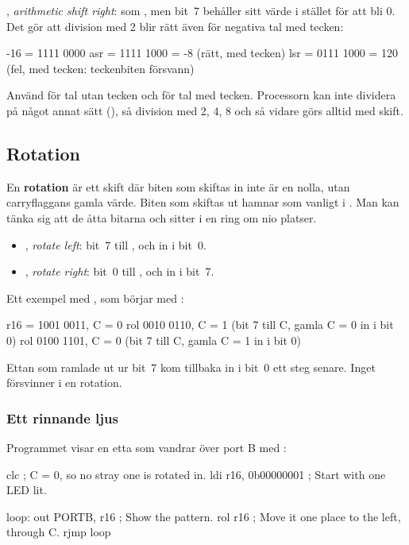 \textbf{}, \emph{arithmetic shift right}: som , men bit~7 behåller sitt värde i
stället för att bli 0. Det gör att division med 2 blir rätt även för negativa tal med tecken:

\begin{textdrawing}
   -16  =  1111 0000
   asr  =  1111 1000  =  -8     (rätt, med tecken)
   lsr  =  0111 1000  =  120    (fel, med tecken: teckenbiten försvann)
\end{textdrawing}

\noindent Använd  för tal utan tecken och  för tal med tecken. Processorn kan
inte dividera på något annat sätt (), så division med 2, 4, 8 och så vidare görs
alltid med skift.

\subsection{Rotation}
\label{c8:b4}
En \textbf{rotation} är ett skift där biten som skiftas in inte är en nolla, utan carryflaggans
gamla värde. Biten som skiftas ut hamnar som vanligt i . Man kan tänka sig att de åtta
bitarna och  sitter i en ring om nio platser.

\begin{itemize}
  \item \textbf{}, \emph{rotate left}: bit~7 till , och  in i bit~0.
  \item \textbf{}, \emph{rotate right}: bit~0 till , och  in i bit~7.
\end{itemize}

Ett exempel med , som börjar med :

\begin{textdrawing}
   r16 = 1001 0011, C = 0
   rol   0010 0110, C = 1     (bit 7 till C, gamla C = 0 in i bit 0)
   rol   0100 1101, C = 0     (bit 7 till C, gamla C = 1 in i bit 0)
\end{textdrawing}

\noindent Ettan som ramlade ut ur bit~7 kom tillbaka in i bit~0 ett steg senare. Inget försvinner i
en rotation.

\subsubsection{Ett rinnande ljus}
Programmet  visar en etta som vandrar över port B med :

\begin{asmcode}
    clc                             ; C = 0, so no stray one is rotated in.
    ldi r16, 0b00000001             ; Start with one LED lit.

loop:
    out PORTB, r16                  ; Show the pattern.
    rol r16                         ; Move it one place to the left, through C.
    rjmp loop
\end{asmcode}

